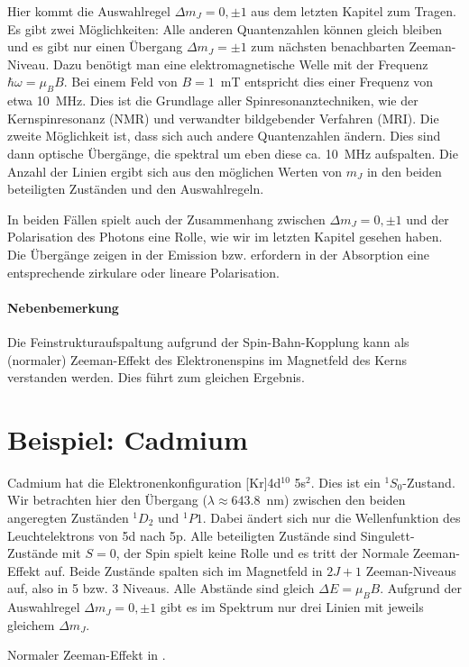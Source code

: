 Hier kommt die Auswahlregel $\Delta m_J = 0, \pm1$ aus dem letzten Kapitel zum Tragen. Es gibt zwei Möglichkeiten: Alle anderen Quantenzahlen können gleich bleiben und es gibt nur einen Übergang $\Delta m_J = \pm1$ zum nächsten benachbarten Zeeman-Niveau. Dazu benötigt man eine elektromagnetische Welle mit der Frequenz $\hbar \omega = \mu_B B$. Bei einem Feld von $B=1$~mT entspricht dies einer Frequenz von etwa 10~MHz. Dies ist die Grundlage aller Spinresonanztechniken, wie der Kernspinresonanz (NMR) und verwandter bildgebender Verfahren (MRI). Die zweite Möglichkeit ist, dass sich auch andere Quantenzahlen ändern. Dies sind dann optische Übergänge, die spektral um eben diese ca. 10~MHz aufspalten. Die Anzahl der Linien ergibt sich aus den möglichen Werten von $m_J$ in den beiden beteiligten Zuständen und den Auswahlregeln.


In beiden Fällen spielt auch der Zusammenhang zwischen $\Delta m_J = 0, \pm1$ und der Polarisation des Photons eine Rolle, wie wir im letzten Kapitel gesehen haben. Die Übergänge zeigen in der Emission bzw. erfordern in der Absorption eine entsprechende zirkulare oder lineare Polarisation.


\paragraph{Nebenbemerkung} Die Feinstrukturaufspaltung aufgrund der Spin-Bahn-Kopplung kann als (normaler) Zeeman-Effekt des Elektronenspins im Magnetfeld des Kerns verstanden werden. Dies führt zum gleichen Ergebnis.

\section{Beispiel: Cadmium}

Cadmium hat die Elektronenkonfiguration [Kr]4d$^{10}$ 5s$^2$. Dies ist ein $^1S_0$-Zustand. Wir betrachten hier den Übergang ($\lambda \approx 643.8$~nm) zwischen den beiden angeregten Zuständen $^1D_2$ und $^1P1$. Dabei ändert sich nur die Wellenfunktion des Leuchtelektrons von 5d nach 5p. Alle beteiligten Zustände sind Singulett-Zustände mit $S=0$, der Spin spielt keine Rolle und es tritt der Normale Zeeman-Effekt auf. Beide Zustände spalten sich im Magnetfeld in $2J+1$ Zeeman-Niveaus auf, also in 5 bzw. 3 Niveaus. Alle Abstände sind gleich $\Delta E = \mu_B B$. Aufgrund der Auswahlregel $\Delta m_J = 0, \pm1$ gibt es im Spektrum nur drei Linien mit jeweils gleichem $\Delta m_J$.

\begin{marginfigure} 
    \caption{Normaler Zeeman-Effekt in .}
\end{marginfigure}


